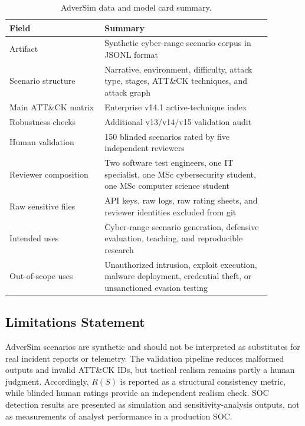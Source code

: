 \begin{table}[t]
\centering
\caption{AdverSim data and model card summary.}
\begin{tabular}{p{0.32\linewidth}p{0.56\linewidth}}
\hline
Field & Summary \\
\hline
Artifact & Synthetic cyber-range scenario corpus in JSONL format \\
Scenario structure & Narrative, environment, difficulty, attack type, stages, ATT\&CK techniques, and attack graph \\
Main ATT\&CK matrix & Enterprise v14.1 active-technique index \\
Robustness checks & Additional v13/v14/v15 validation audit \\
Human validation & 150 blinded scenarios rated by five independent reviewers \\
Reviewer composition & Two software test engineers, one IT specialist, one MSc cybersecurity student, one MSc computer science student \\
Raw sensitive files & API keys, raw logs, raw rating sheets, and reviewer identities excluded from git \\
Intended uses & Cyber-range scenario generation, defensive evaluation, teaching, and reproducible research \\
Out-of-scope uses & Unauthorized intrusion, exploit execution, malware deployment, credential theft, or unsanctioned evasion testing \\
\hline
\end{tabular}
\end{table}

\subsection{Limitations Statement}

AdverSim scenarios are synthetic and should not be interpreted as substitutes
for real incident reports or telemetry. The validation pipeline reduces
malformed outputs and invalid ATT\&CK IDs, but tactical realism remains partly a
human judgment. Accordingly, $R(S)$ is reported as a structural consistency
metric, while blinded human ratings provide an independent realism check. SOC
detection results are presented as simulation and sensitivity-analysis outputs,
not as measurements of analyst performance in a production SOC.
